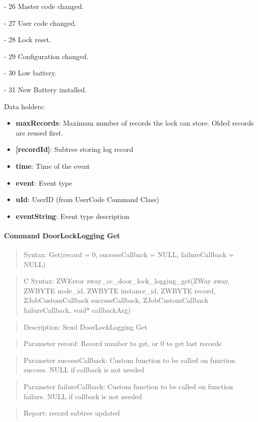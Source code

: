 - 26 Master code changed. 

- 27 User code changed. 

- 28 Lock reset. 

- 29 Configuration changed. 

- 30 Low battery. 

- 31 New Battery installed.
\newline

\noindent
Data holders:

\begin{itemize}
\item \textbf{maxRecords}: Maximum number of records the lock can store. Olded records are reused first.
\item \textbf{[recordId]}: Subtree storing log record
\item \qquad\textbf{time}: Time of the event
\item \qquad\textbf{event}: Event type
\item \qquad\textbf{uId}: UserID (from UserCode Command Class)
\item \qquad\textbf{eventString}: Event type description
\end{itemize}

\paragraph{Command DoorLockLogging Get}
\begin{quote}Syntax: Get(record = 0, successCallback = NULL, failureCallback = NULL)\end{quote}
\begin{quote}C Syntax: ZWError zway\_cc\_door\_lock\_logging\_get(ZWay zway, ZWBYTE node\_id, ZWBYTE instance\_id, ZWBYTE record, ZJobCustomCallback successCallback, ZJobCustomCallback failureCallback, void* callbackArg)\end{quote}
\begin{quote}Description: Send DoorLockLogging Get\end{quote}
\begin{quote}Parameter record: Record number to get, or 0 to get last records\end{quote}
\begin{quote}Parameter successCallback: Custom function to be called on function success. NULL if callback is not needed\end{quote}
\begin{quote}Parameter failureCallback: Custom function to be called on function failure. NULL if callback is not needed\end{quote}
\begin{quote}Report: record subtree updated\end{quote}


